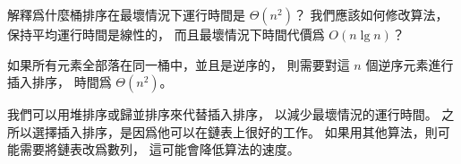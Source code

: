 \startEXERCISE
解釋爲什麼桶排序在最壞情況下運行時間是 $\Theta(n^2)$？
我們應該如何修改算法，保持平均運行時間是線性的，
而且最壞情況下時間代價爲 $O(n\lg{n})$？
\stopEXERCISE

\startANSWER
如果所有元素全部落在同一桶中，並且是逆序的，
則需要對這 $n$ 個逆序元素進行插入排序，
時間爲 $\Theta(n^2)$。

我們可以用堆排序或歸並排序來代替插入排序，
以減少最壞情況的運行時間。
之所以選擇插入排序，是因爲他可以在鏈表上很好的工作。
如果用其他算法，則可能需要將鏈表改爲數列，
這可能會降低算法的速度。
\stopANSWER
